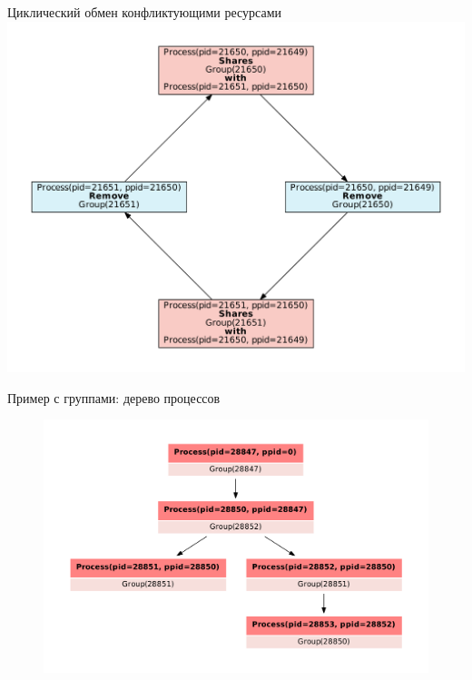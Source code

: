 \begin{frame}{Циклический обмен конфликтующими ресурсами}
\centering
\includegraphics[scale=0.4]{fig/badexcycle.pdf}
\end{frame}

\begin{frame}{Пример с группами: дерево процессов}
	\begin{figure}[ht!]
	\centering
	\includegraphics[width=\textwidth]{fig/groups-pstree.pdf}
	\end{figure}
\end{frame}

